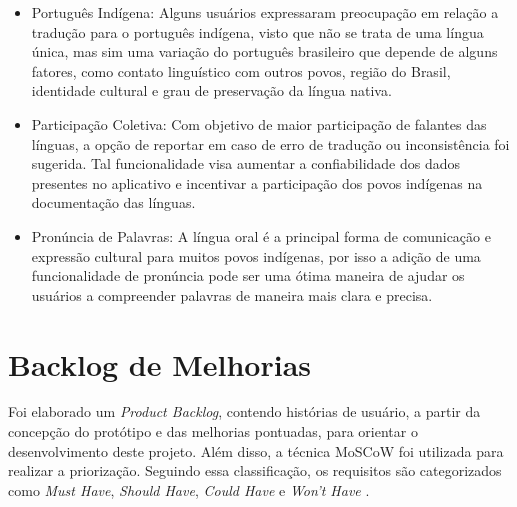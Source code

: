 \begin{itemize}
	\item Português Indígena: Alguns usuários expressaram preocupação em relação a tradução para o português indígena, visto que não se trata de uma língua única, mas sim uma variação do português brasileiro que depende de alguns fatores, como contato linguístico com outros 
	povos, região do Brasil, identidade cultural e grau de preservação da língua nativa.
	\item Participação Coletiva: Com objetivo de maior participação de falantes das línguas, a opção de reportar em caso de erro de tradução ou inconsistência foi sugerida. Tal funcionalidade visa aumentar a confiabilidade dos dados presentes no aplicativo e incentivar a 
	participação dos povos indígenas na documentação das línguas.
	\item Pronúncia de Palavras: A língua oral é a principal forma de comunicação e expressão cultural para muitos povos indígenas, por isso a adição de uma funcionalidade de pronúncia pode ser uma ótima maneira de ajudar os usuários a compreender palavras de maneira mais clara 
	e precisa.
\end{itemize}

\section{Backlog de Melhorias}
\label{sec:Backlog de Melhorias}
Foi elaborado um \textit{Product Backlog}, contendo histórias de usuário, a partir da concepção do protótipo e das melhorias pontuadas, para orientar o desenvolvimento deste projeto. Além disso, a técnica MoSCoW foi utilizada para realizar a priorização. Seguindo essa classificação, 
os requisitos são categorizados como \textit{Must Have}, \textit{Should Have}, \textit{Could Have} e \textit{Won't Have} \cite{miranda2021}. 


